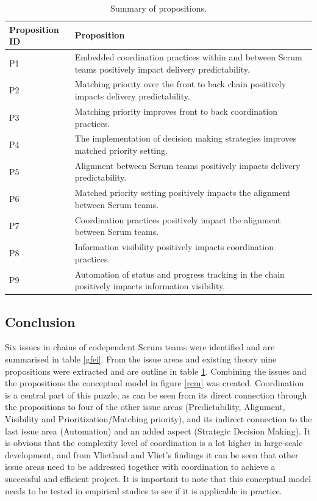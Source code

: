 \begin{table}[H]
\begin{center}
    \begin{tabular}{| p{3.25cm} | p{8cm} |}
    \hline
    \textbf{Proposition ID} & \textbf{Proposition} \\ \hline
    P1 & Embedded coordination practices within and between Scrum teams positively impact delivery predictability. \\ \hline
    P2 & Matching priority over the front to back chain positively impacts delivery predictability.
 \\ \hline
    P3 & Matching priority improves front to back coordination practices. \\ \hline
    P4 & The implementation of decision making strategies improves matched priority setting. \\ \hline
    P5 & Alignment between Scrum teams positively impacts delivery predictability. \\ \hline
    P6 & Matched priority setting positively impacts the alignment between Scrum teams. \\ \hline
    P7 & Coordination practices positively impact the alignment between Scrum teams.
 \\ \hline
    P8 & Information visibility positively impacts coordination practices. \\ \hline
    P9 & Automation of status and progress tracking in the chain positively impacts information visibility. \\ \hline
    \end{tabular}
    \caption{Summary of propositions.}
    \label{sop}
\end{center}
\end{table}

\subsection{Conclusion}

Six issues in chains of codependent Scrum teams were identified and are summarised in table \ref{gfei}. From the issue areas and existing theory nine propositions were extracted and are outline in table \ref{sop}. Combining the issues and the propositions the conceptual model in figure \ref{rcm} was created. Coordination is a central part of this puzzle, as can be seen from its direct connection through the propositions to four of the other issue areas (Predictability, Alignment, Visibility and Prioritization/Matching priority), and its indirect connection to the last issue area (Automation) and an added aspect (Strategic Decision Making). It is obvious that the complexity level of coordination is a lot higher in large-scale development, and from Vlietland and Vliet's findings it can be seen that other issue areas need to be addressed together with coordination to achieve a successful and efficient project. It is important to note that this conceptual model needs to be tested in empirical studies to see if it is applicable in practice.
